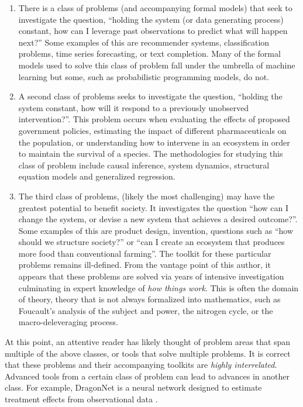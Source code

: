 \documentclass{article}
\begin{document}
\begin{enumerate}
    \item There is a class of problems (and accompanying formal models)
    that seek to investigate the question, ``holding the system (or data generating process) constant, how can I
    leverage past observations to predict what will happen next?'' Some examples of this are recommender
    systems, classification problems, time series forecasting, or text completion. Many of the formal
    models used to solve this class of problem fall under the umbrella of machine learning but some, 
    such as probabilistic programming models, do not.

    \item A second class of problems seeks to investigate the question, ``holding the system constant, how will
    it respond to a previously unobserved intervention?''. This problem occurs when evaluating the effects of proposed
    government policies, estimating the impact of different pharmaceuticals on the population, or understanding how
    to intervene in an ecosystem in order to maintain the survival of a species. The methodologies for studying
    this class of problem include causal inference, system dynamics, structural equation models and generalized regression.

    \item The third class of problems, (likely the most challenging) may have the greatest potential to benefit
    society. It investigates the question ``how can I change the system, or devise a new system that achieves a
    desired outcome?''. Some examples of this are product design, invention, questions such as
    ``how should we structure society?'' or ``can I create an ecosystem that produces more food than conventional
    farming''. The toolkit for these particular problems remains ill-defined. From the vantage point of this author,
    it appears that these problems are solved via years of intensive investigation culminating in expert knowledge
    of \textit{how things work}. This is often the domain of theory, theory that is not always formalized into mathematics,
    such as Foucault's analysis of the subject and power, the nitrogen cycle, or the macro-deleveraging process.

\end{enumerate}

At this point, an attentive reader has likely thought of problem areas that span multiple of the above classes, or tools
that solve multiple problems. It is correct that these problems and their accompanying toolkits are \textit{highly interrelated}.
Advanced tools from a certain class of problem can lead to advances in another class. For example, DragonNet is a neural
network designed to estimate treatment effects from observational data  \cite{shi2019adapting}. 
\end{document}
